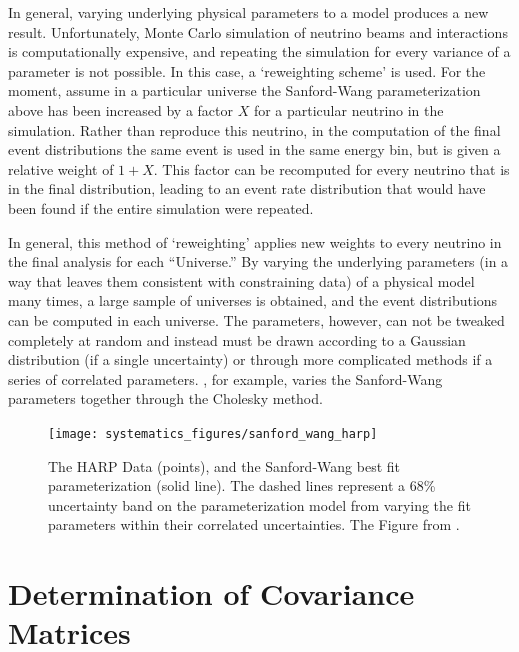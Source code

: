 In general, varying underlying physical parameters to a model produces a new result.  Unfortunately, Monte Carlo simulation of neutrino beams and interactions is computationally expensive, and repeating the simulation for every variance of a parameter is not possible.  In this case, a `reweighting scheme' is used.  For the moment, assume in a particular universe the Sanford-Wang parameterization above has been increased by a factor $X$ for a particular neutrino in the simulation.  Rather than reproduce this neutrino, in the computation of the final event distributions the same event is used in the same energy bin, but is given a relative weight of $1 + X$.  This factor can be recomputed for every neutrino that is in the final distribution, leading to an event rate distribution that would have been found if the entire simulation were repeated.

In general, this method of `reweighting' applies new weights to every neutrino in the final analysis for each ``Universe.''  By varying the underlying parameters (in a way that leaves them consistent with constraining data) of a physical model many times, a large sample of universes is obtained, and the event distributions can be computed in each universe.  The parameters, however, can not be tweaked completely at random and instead must be drawn according to a Gaussian distribution (if a single uncertainty) or through more complicated methods if a series of correlated parameters.  \MB, for example, varies the Sanford-Wang parameters together through the Cholesky method.


\begin{figure}[tb]
  \centering
  \texttt{[image: systematics\_figures/sanford\_wang\_harp]}
  \caption{The HARP Data (points), and the Sanford-Wang best fit parameterization (solid line).  The dashed lines represent a 68\% uncertainty band on the parameterization model from varying the fit parameters within their correlated uncertainties.  The Figure from \cite{AguilarArevalo:2008yp}.}
  \label{fig:sanford_wang_harp}
\end{figure}

\section{Determination of Covariance Matrices}
\label{sec:covariance_matrix}

